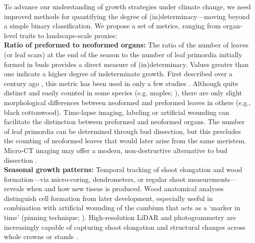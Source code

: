 \documentclass{article}
\begin{document}
	\begin{tcolorbox}[
		colback=gray!5!white,  %
		colframe=black,      %
		coltitle=white,      %
		fonttitle=\bfseries, %
		boxrule=0.5pt,       %
		title=\textbf{Box 1: Metrics of (In)determinacy}
		]
	
		To advance our understanding of growth strategies under climate change, we need improved methods for quantifying the degree of (in)determinacy—moving beyond a simple binary classification. We propose a set of metrics, ranging from organ-level traits to landscape-scale proxies:\\
		

			\textbf{Ratio of preformed to neoformed organs:} 
			The ratio of the number of leaves (or leaf scars) at the end of the season to the number of leaf primordia initially formed in buds provides a direct measure of (in)determinacy. Values greater than one indicate a higher degree of indeterminate growth. First described over a century ago \citep{mooreStudyWinterBuds1909}, this metric has been used in only a few studies \citep{damascosBudCompositionBranching2005, kikuzawaLeafSurvivalWoody1983, guedonRelativeExtentsPreformation2006}. Although quite distinct and easily counted in some species (e.g. maples; \citealt{critchfieldShootGrowthHeterophylly1971}), there are only slight morphological differences between neoformed and preformed leaves in others (e.g., black cottonwood). Time-lapse imaging, labeling or artificial wounding can facilitate the distinction between preformed and neoformed organs. The number of leaf primordia can be determined through bud dissection, but this precludes the counting of neoformed leaves that would later arise from the same meristem. Micro-CT imaging may offer a modern, non-destructive alternative to bud dissection \citep{kovaleskiXrayPhaseContrast2019}.\\
			
			 \textbf{Seasonal growth patterns:} Temporal tracking of shoot elongation and wood formation—via micro-coring, dendrometers, or regular shoot measurements—reveals when and how new tissue is produced. Wood anatomical analyses distinguish cell formation from later development, especially useful in combination with artificial wounding of the cambium that acts as a `marker in time’ (pinning technique; \citealt{gartnerCambialActivityMoringa2021a}). High-resolution LiDAR and photogrammetry are increasingly capable of capturing shoot elongation and structural changes across whole crowns or stands \citep{zhangForestsGrowthMonitoring2019, jinEstimationLarchGrowth2022}.\\
			

\end{tcolorbox}
\end{document}

